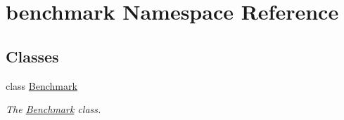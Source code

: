\hypertarget{namespacebenchmark}{}\section{benchmark Namespace Reference}
\label{namespacebenchmark}
\subsection*{Classes}
\begin{DoxyCompactItemize}
\item 
class \hyperlink{classbenchmark_1_1_benchmark}{Benchmark}
\begin{DoxyCompactList}\small\item\em The \hyperlink{classbenchmark_1_1_benchmark}{Benchmark} class. \end{DoxyCompactList}\end{DoxyCompactItemize}
